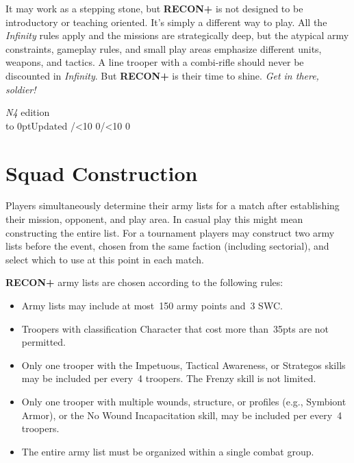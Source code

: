 \documentclass[14pt,dvipsnames]{extarticle}
\def\twodigits#1{\ifnum#1<10 0\fi\the#1}
\newcommand{\reconplus}{\textbf{RECON+}\xspace}
\begin{document}
It may work as a stepping stone, but \reconplus is not designed to be
introductory or teaching oriented.  It's simply a different way to
play.  All the \emph{Infinity} rules apply and the missions are
strategically deep, but the atypical army constraints, gameplay rules,
and small play areas emphasize different units, weapons, and tactics.
A line trooper with a combi-rifle should never be discounted in
\emph{Infinity}.  But \reconplus is their time to shine.  \emph{Get in
there, soldier!}

\tableofcontents

\vfill
\hfill{\small\emph{N4} edition}\\
\hbox to 0pt{}\hfill{\small Updated \the\year/\twodigits\month/\twodigits\day}

\clearpage
{}

\section{Squad Construction}

Players simultaneously determine their army lists for a match after
establishing their mission, opponent, and play area.  In casual play
this might mean constructing the entire list.  For a tournament
players may construct two army lists before the event, chosen from the
same faction (including sectorial), and select which to use at this
point in each match.

\reconplus army lists are chosen according to the following rules:

\vspace{-0.5em}
\begin{itemize}
\item Army lists may include at most~150 army points and~3 SWC.

\item Troopers with classification Character that cost more than~35pts
  are not permitted.

\item Only one trooper with the Impetuous, Tactical Awareness, or
  Strategos skills may be included per every~4 troopers.  The Frenzy
  skill is not limited.

\item Only one trooper with multiple wounds, structure, or profiles
  (e.g., Symbiont Armor), or the No Wound Incapacitation skill, may be
  included per every~4 troopers.

\item The entire army list must be organized within a single combat
  group.
\end{itemize}
\end{document}
